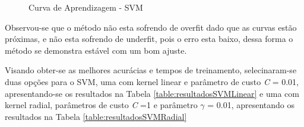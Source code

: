 \begin{figure}[h]
	\centering
{}
\caption{Curva de Aprendizagem - SVM}
\label{fig:SVM}
\end{figure}

Observou-se que o método não esta sofrendo de overfit dado que as curvas estão próximas, e não esta sofrendo de underfit, pois o erro esta baixo, dessa forma o método se demonstra estável com um bom ajuste. 

Visando obter-se as melhores acurácias e tempos de treinamento, selecinaram-se duas opções para o SVM, uma com kernel linear e parâmetro de custo \emph{C} = 0.01, apresentando-se os resultados na Tabela \ref{table:resultadosSVMLinear} e uma com kernel radial, parâmetros de custo \emph{C} =1 e parâmetro \(\gamma\) = 0.01, apresentando os resultados na Tabela \ref{table:resultadosSVMRadial}

